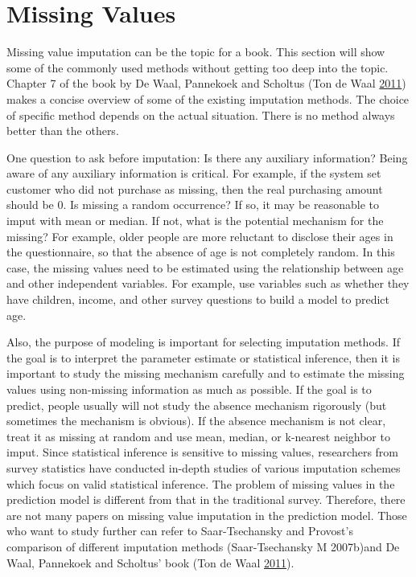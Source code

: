 \documentclass[]{book}
\theoremstyle{definition}
\theoremstyle{definition}
\theoremstyle{remark}
\begin{document}
\section{Missing Values}\label{missing-values}

Missing value imputation can be the topic for a book. This section will
show some of the commonly used methods without getting too deep into the
topic. Chapter 7 of the book by De Waal, Pannekoek and Scholtus (Ton de
Waal \protect\hyperlink{ref-impute1}{2011}) makes a concise overview of
some of the existing imputation methods. The choice of specific method
depends on the actual situation. There is no method always better than
the others.

One question to ask before imputation: Is there any auxiliary
information? Being aware of any auxiliary information is critical. For
example, if the system set customer who did not purchase as missing,
then the real purchasing amount should be 0. Is missing a random
occurrence? If so, it may be reasonable to imput with mean or median. If
not, what is the potential mechanism for the missing? For example, older
people are more reluctant to disclose their ages in the questionnaire,
so that the absence of age is not completely random. In this case, the
missing values need to be estimated using the relationship between age
and other independent variables. For example, use variables such as
whether they have children, income, and other survey questions to build
a model to predict age.

Also, the purpose of modeling is important for selecting imputation
methods. If the goal is to interpret the parameter estimate or
statistical inference, then it is important to study the missing
mechanism carefully and to estimate the missing values using non-missing
information as much as possible. If the goal is to predict, people
usually will not study the absence mechanism rigorously (but sometimes
the mechanism is obvious). If the absence mechanism is not clear, treat
it as missing at random and use mean, median, or k-nearest neighbor to
imput. Since statistical inference is sensitive to missing values,
researchers from survey statistics have conducted in-depth studies of
various imputation schemes which focus on valid statistical inference.
The problem of missing values in the prediction model is different from
that in the traditional survey. Therefore, there are not many papers on
missing value imputation in the prediction model. Those who want to
study further can refer to Saar-Tsechansky and Provost's comparison of
different imputation methods (Saar-Tsechansky M 2007b)and De Waal,
Pannekoek and Scholtus' book (Ton de Waal
\protect\hyperlink{ref-impute1}{2011}).
\end{document}
